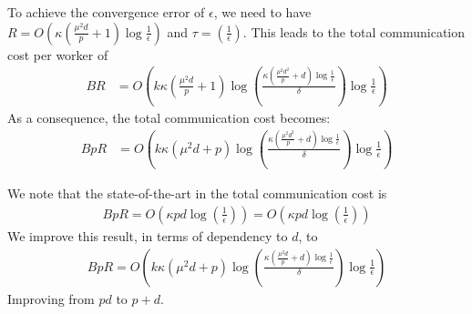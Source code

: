 \begin{remark}
To achieve the convergence error of $\epsilon$, we need to have $R=O\left(\kappa(\frac{\mu^2d}{p}+1)\log\frac{1}{\epsilon}\right)$ and $\tau=\left(\frac{1}{\epsilon}\right)$. This leads to the total communication cost per worker of 
\begin{align}
BR&=O\left(k\kappa(\frac{\mu^2d}{p}+1)\log\left(\frac{\kappa(\frac{\mu^2d^2}{p}+d)\log\frac{1}{\epsilon}}{\delta}\right)\log\frac{1}{\epsilon} \right)
\end{align}
As a consequence, the total communication cost becomes:
\begin{align}
BpR&=O\left(k\kappa(\mu^2d+p)\log\left(\frac{\kappa(\frac{\mu^2d^2}{p}+d)\log\frac{1}{\epsilon}}{\delta}\right)\log\frac{1}{\epsilon} \right)
\end{align}
\end{remark}

\begin{remark}
We note that the state-of-the-art in \cite{karimireddy2019scaffold} the total communication cost is 
\begin{align}
    BpR=O\left(\kappa pd\log\left(\frac{1}{\epsilon}\right) \right)=O\left(\kappa pd\log\left(\frac{1}{\epsilon}\right)\right) 
\end{align}
We improve this result, in terms of dependency to $d$, to 
\begin{align}
    BpR=O\left(k\kappa(\mu^2d+p)\log\left(\frac{\kappa(\frac{\mu^2d}{p}+d)\log\frac{1}{\epsilon}}{\delta}\right)\log\frac{1}{\epsilon} \right)
\end{align}
Improving from $pd$ to $p+d$.
\end{remark}






